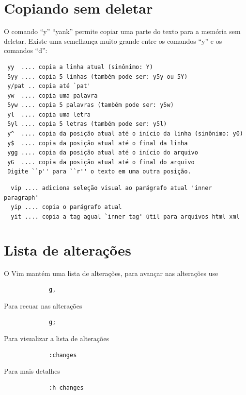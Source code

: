 \documentclass[10pt,a4paper,openany]{book}
\begin{document}
\section{Copiando sem deletar}\label{Copiando sem deletar}

O comando ``y'' ``yank'' permite copiar uma parte do texto para a memória sem deletar.
Existe uma semelhança muito grande entre os comandos ``y'' e os comandos ``d'':

\begin{verbatim}
 yy  .... copia a linha atual (sinônimo: Y)
 5yy .... copia 5 linhas (também pode ser: y5y ou 5Y)
 y/pat .. copia até `pat'
 yw  .... copia uma palavra
 5yw .... copia 5 palavras (também pode ser: y5w)
 yl  .... copia uma letra
 5yl .... copia 5 letras (também pode ser: y5l)
 y^  .... copia da posição atual até o início da linha (sinônimo: y0)
 y$  .... copia da posição atual até o final da linha
 ygg .... copia da posição atual até o início do arquivo
 yG  .... copia da posição atual até o final do arquivo
 Digite ``p'' para ``r'' o texto em uma outra posição.
\end{verbatim}

\begin{verbatim}
  vip .... adiciona seleção visual ao parágrafo atual 'inner paragraph'
  yip .... copia o parágrafo atual
  yit .... copia a tag agual `inner tag' útil para arquivos html xml
\end{verbatim}

\section{Lista de alterações}
O Vim mantém uma lista de alterações, para avançar nas alterações use

\begin{verbatim}
			 g,
\end{verbatim}

Para recuar nas alterações

\begin{verbatim}
			 g;
\end{verbatim}

Para visualizar a lista de alterações

\begin{verbatim}
			 :changes
\end{verbatim}

Para mais detalhes

\begin{verbatim}
			 :h changes
\end{verbatim}
\end{document}

